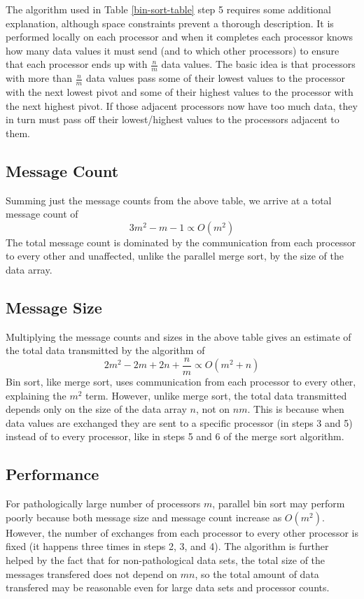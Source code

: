 \documentclass[10pt]{article}
\begin{document}
The algorithm used in Table \ref{bin-sort-table} step 5 requires some additional explanation, although space constraints prevent a thorough description. It is performed locally on each processor and when it completes each processor knows how many data values it must send (and to which other processors) to ensure that each processor ends up with \( \frac{n}{m} \) data values. The basic idea is that processors with more than \( \frac{n}{m} \) data values pass some of their lowest values to the processor with the next lowest pivot and some of their highest values to the processor with the next highest pivot. If those adjacent processors now have too much data, they in turn must pass off their lowest/highest values to the processors adjacent to them.


\subsection{Message Count}
Summing just the message counts from the above table, we arrive at a total message count of \[3m^2-m-1 \propto O(m^2)\] The total message count is dominated by the communication from each processor to every other and unaffected, unlike the parallel merge sort, by the size of the data array.

\subsection{Message Size}
Multiplying the message counts and sizes in the above table gives an estimate of the total data transmitted by the algorithm of \[2m^2-2m+2n+\frac{n}{m} \propto O(m^2+n)\] Bin sort, like merge sort, uses communication from each processor to every other, explaining the \(m^2\) term. However, unlike merge sort, the total data transmitted depends only on the size of the data array \(n\), not on \(nm\). This is because when data values are exchanged they are sent to a specific processor (in steps 3 and 5) instead of to every processor, like in steps 5 and 6 of the merge sort algorithm.

\subsection{Performance}
\label{binperformance}
For pathologically large number of processors \(m\), parallel bin sort may perform poorly because both message size and message count increase as \(O(m^2)\). However, the number of exchanges from each processor to every other processor is fixed (it happens three times in steps 2, 3, and 4). The algorithm is further helped by the fact that for non-pathological data sets, the total size of the messages transfered does not depend on \(mn\), so the total amount of data transfered may be reasonable even for large data sets and processor counts.
\end{document}
